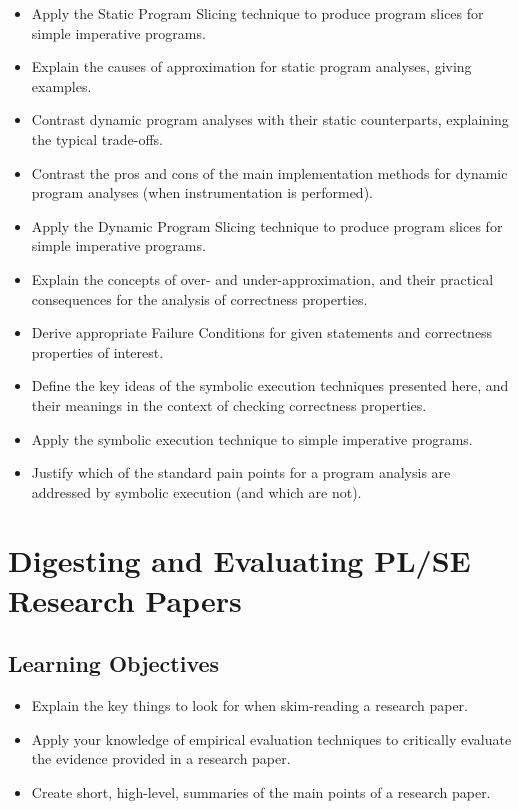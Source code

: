 \documentclass{article}
\begin{document}
\begin{itemize}
    \item Apply the Static Program Slicing technique to produce program slices for simple imperative programs.
    \item Explain the causes of approximation for static program analyses, giving examples.
    \item Contrast dynamic program analyses with their static counterparts, explaining the typical trade-offs.
    \item Contrast the pros and cons of the main implementation methods for dynamic program analyses (when instrumentation is performed).
    \item Apply the Dynamic Program Slicing technique to produce program slices for simple imperative programs.
    \item Explain the concepts of over- and under-approximation, and their practical consequences for the analysis of correctness properties.
    \item Derive appropriate Failure Conditions for given statements and correctness properties of interest.
    \item Define the key ideas of the symbolic execution techniques presented here, and their meanings in the context of checking correctness properties.
    \item Apply the symbolic execution technique to simple imperative programs.
    \item Justify which of the standard pain points for a program analysis are addressed by symbolic execution (and which are not).
\end{itemize}

\section{Digesting and Evaluating PL/SE Research Papers}

\subsection{Learning Objectives}

\begin{itemize}
    \item Explain the key things to look for when skim-reading a research paper.
    \item Apply your knowledge of empirical evaluation techniques to critically evaluate the evidence provided in a research paper.
    \item Create short, high-level, summaries of the main points of a research paper.
\end{itemize}
\end{document}
